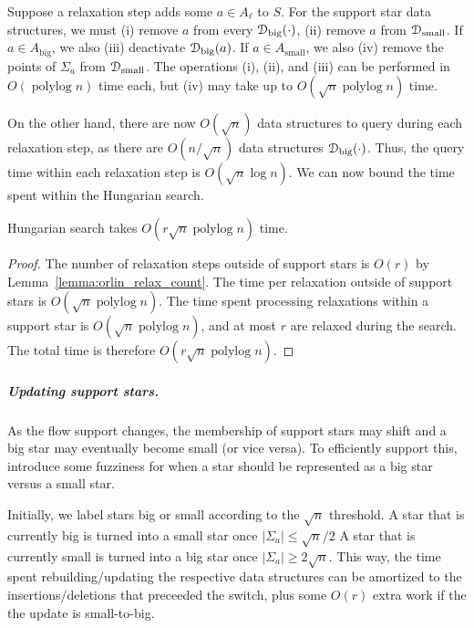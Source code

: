 \documentclass[a4paper,UKenglish]{socg-lipics-v2018}
\def\polylog{\mathop{\mathrm{polylog}}}
\def\abs#1{\mathopen| #1 \mathclose|}		%
\theoremstyle{plain}
\numberwithin{figure}{section}
\renewcommand{\paragraph}{\subparagraph}
\begin{document}
Suppose a relaxation step adds some $a \in A_\ell$ to $S$.
For the support star data structures, we must
(i) remove $a$ from every $\EuScript{D}_\text{big}(\cdot)$,
(ii) remove $a$ from $\EuScript{D}_\text{small}$.
If $a \in A_\text{big}$, we also (iii) deactivate $\EuScript{D}_\text{big}(a)$.
If $a \in  A_\text{small}$, we also (iv) remove the points of $\Sigma_a$ from
$\EuScript{D}_\text{small}$.
The operations (i), (ii), and (iii) can be performed in $O(\polylog n)$ time
each, but (iv) may take up to $O(\sqrt{n}\polylog n)$ time.

On the other hand, there are now $O(\sqrt{n})$ data structures to query during
each relaxation step, as there are $O(n/\sqrt{n})$ data structures
$\EuScript{D}_\text{big}(\cdot)$.
Thus, the query time within each relaxation step is $O(\sqrt{n}\log n)$.
We can now bound the time spent within the Hungarian search.

\begin{lemmarep}
\label{lemma:orlin_hs_time}
Hungarian search takes $O(r\sqrt{n}\polylog n)$ time.
\end{lemmarep}

\begin{proof}
The number of relaxation steps outside of support stars is $O(r)$ by
Lemma~\ref{lemma:orlin_relax_count}.
The time per relaxation outside of support stars is $O(\sqrt{n}\polylog n)$.
The time spent processing relaxations within a support star is
$O(\sqrt{n}\polylog n)$, and at most $r$ are relaxed during the search.
The total time is therefore $O(r\sqrt{n}\polylog n)$.
\end{proof}

\paragraph{Updating support stars.}
As the flow support changes, the membership of support stars may shift and
a big star may eventually become small (or vice versa).
To efficiently support this, introduce some fuzziness for when a star should be
represented as a big star versus a small star.

Initially, we label stars big or small according to the $\sqrt{n}$ threshold.
A star that is currently big is turned into a small star once
$\abs{\Sigma_a} \leq \sqrt{n}/2$
A star that is currently small is turned into a big star once
$\abs{\Sigma_a} \geq 2\sqrt{n}$.
This way, the time spent rebuilding/updating the respective data structures
can be amortized to the insertions/deletions that preceeded the switch, plus
some $O(r)$ extra work if the the update is small-to-big.
\end{document}
